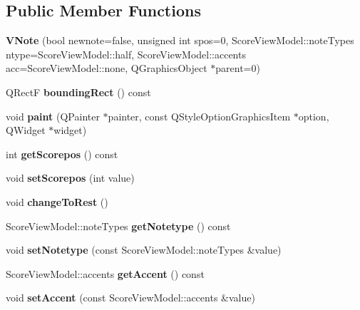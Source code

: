 \subsection*{Public Member Functions}
\begin{DoxyCompactItemize}
\item 
\hypertarget{class_v_note_ae8c4cf09c4846142f0fb29277c3ec27a}{}{\bfseries V\+Note} (bool newnote=false, unsigned int spos=0, Score\+View\+Model\+::note\+Types ntype=Score\+View\+Model\+::half, Score\+View\+Model\+::accents acc=Score\+View\+Model\+::none, Q\+Graphics\+Object $\ast$parent=0)\label{class_v_note_ae8c4cf09c4846142f0fb29277c3ec27a}

\item 
\hypertarget{class_v_note_a0c2d23d2544e6c898d022c43a9a415bb}{}Q\+Rect\+F {\bfseries bounding\+Rect} () const \label{class_v_note_a0c2d23d2544e6c898d022c43a9a415bb}

\item 
\hypertarget{class_v_note_ad128b6e755d08912b725445f66759860}{}void {\bfseries paint} (Q\+Painter $\ast$painter, const Q\+Style\+Option\+Graphics\+Item $\ast$option, Q\+Widget $\ast$widget)\label{class_v_note_ad128b6e755d08912b725445f66759860}

\item 
\hypertarget{class_v_note_aa867aa12bc455041eb5e84b3cf9828f5}{}int {\bfseries get\+Scorepos} () const \label{class_v_note_aa867aa12bc455041eb5e84b3cf9828f5}

\item 
\hypertarget{class_v_note_a9c476ddccb3cb3e3573688bd4956c89b}{}void {\bfseries set\+Scorepos} (int value)\label{class_v_note_a9c476ddccb3cb3e3573688bd4956c89b}

\item 
\hypertarget{class_v_note_a31d3c808548e1f768c25b1a2f84c536d}{}void {\bfseries change\+To\+Rest} ()\label{class_v_note_a31d3c808548e1f768c25b1a2f84c536d}

\item 
\hypertarget{class_v_note_a36b8c39a29fffc4de5fdb4a1073871b8}{}Score\+View\+Model\+::note\+Types {\bfseries get\+Notetype} () const \label{class_v_note_a36b8c39a29fffc4de5fdb4a1073871b8}

\item 
\hypertarget{class_v_note_ac043ebad591f4d5b5506f3ab7d0b6b63}{}void {\bfseries set\+Notetype} (const Score\+View\+Model\+::note\+Types \&value)\label{class_v_note_ac043ebad591f4d5b5506f3ab7d0b6b63}

\item 
\hypertarget{class_v_note_a322432eef57f6c69b10695305c123100}{}Score\+View\+Model\+::accents {\bfseries get\+Accent} () const \label{class_v_note_a322432eef57f6c69b10695305c123100}

\item 
\hypertarget{class_v_note_ad2efcba0091075d64e19bd01fa69817d}{}void {\bfseries set\+Accent} (const Score\+View\+Model\+::accents \&value)\label{class_v_note_ad2efcba0091075d64e19bd01fa69817d}

\end{DoxyCompactItemize}
